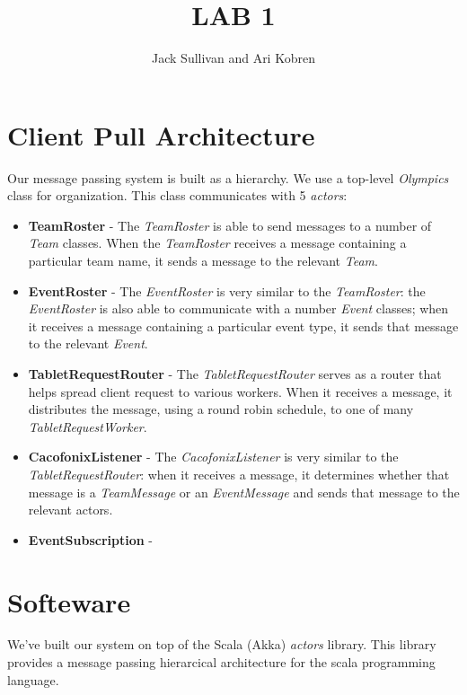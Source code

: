\documentclass[11pt]{article}
\begin{document}
\title{LAB 1}
\author{Jack Sullivan and Ari Kobren}
\maketitle

\section{Client Pull Architecture}
Our message passing system is built as a hierarchy. We use a top-level
\emph{Olympics} class for organization.  This class communicates with
5 \emph{actors}:
\begin{itemize}
  \item \textbf{TeamRoster} - The \emph{TeamRoster} is able to send
    messages to a number of \emph{Team} classes. When the
    \emph{TeamRoster} receives a message containing a particular team
    name, it sends a message to the relevant \emph{Team}.
  \item \textbf{EventRoster} - The \emph{EventRoster} is very similar
    to the \emph{TeamRoster}: the \emph{EventRoster} is also able to
    communicate with a number \emph{Event} classes; when it receives a
    message containing a particular event type, it sends that message
    to the relevant \emph{Event}.
  \item \textbf{TabletRequestRouter} - The \emph{TabletRequestRouter}
    serves as a router that helps spread client request to various
    workers.  When it receives a message, it distributes the message,
    using a round robin schedule, to one of many \emph{TabletRequestWorker}.
  \item \textbf{CacofonixListener} - The \emph{CacofonixListener} is
    very similar to the \emph{TabletRequestRouter}: when it receives a
    message, it determines whether that message is a
    \emph{TeamMessage} or an \emph{EventMessage} and sends that
    message to the relevant actors.
  \item \textbf{EventSubscription} -
\end{itemize}

\section{Softeware}
We've built our system on top of the Scala (Akka) \emph{actors}
library.  This library provides a message passing hierarcical
architecture for the scala programming language.
\end{document}
